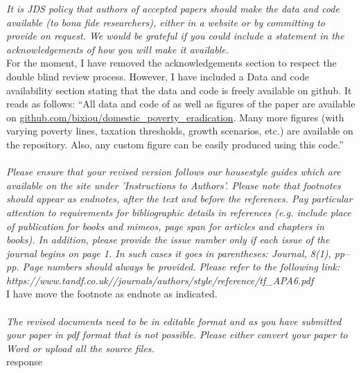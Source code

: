 \documentclass[12pt,english]{article}
\begin{document}
\textit{It is JDS policy that authors of accepted papers should make the data and code available (to bona fide researchers), either in a website or by committing to provide on request.  We would be grateful if you could include a statement in the acknowledgements of how you will make it available.}~\\

For the moment, I have removed the acknowledgements section to respect the double blind review process. However, I have included a Data and code availability section stating that the data and code is freely available on github. It reads as follows: ``All data and code of as well as figures of the paper are available on \href{https://github.com/bixiou/domestic_poverty_eradication}{github.com/bixiou/domestic\_poverty\_eradication}. Many more figures (with varying poverty lines, taxation thresholds, growth scenarios, etc.) are available on the repository. %
Also, any custom figure can be easily produced using this code.''
~\\ ~\\

\textit{Please ensure that your revised version follows our housestyle guides which are available on the site under 'Instructions to Authors'.  Please note that footnotes should appear as endnotes, after the text and before the references.   Pay particular attention to requirements for bibliographic details in references (e.g. include place of publication for books and mimeos, page span for articles and chapters in books).  In addition, please provide the issue number only if each issue of the journal begins on page 1.  In such cases it goes in parentheses:  Journal, 8(1), pp–pp.  Page numbers should always be provided.  Please refer to the following link:   https://www.tandf.co.uk//journals/authors/style/reference/tf\_APA6.pdf}~\\

I have move the footnote as endnote as indicated. 
~\\ ~\\

\textit{The revised documents need to be in editable format and as you have submitted your paper in pdf format that is not possible. Please either convert your paper to Word or upload all the source files.}~\\

response
~\\ ~\\
\end{document}

